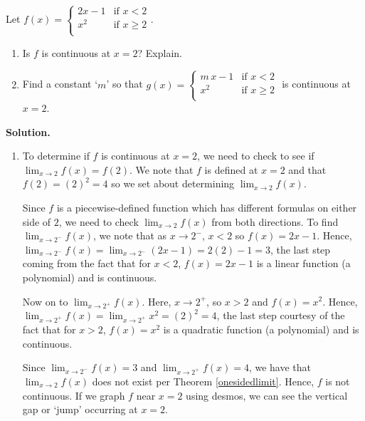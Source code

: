 \documentclass{ximera}
\begin{document}
\begin{example} \label{piecewisecontex}    Let $f(x) = \begin{cases}  2x-1 &  \text{if $x  < 2$}  \\  x^2   & \text{if $x \geq 2$} \\  \end{cases}$.

\begin{enumerate}

\item Is $f$ is continuous at $x = 2$?    Explain.

\item  Find a constant `$m$' so that $g(x) = \begin{cases}  m \, x-1 &  \text{if $x  < 2$}  \\  x^2   & \text{if $x \geq 2$} \\  \end{cases}$ is continuous at $x = 2$.

\end{enumerate}

{\bf Solution.}

\begin{enumerate}

\item To determine if $f$ is continuous at $x=2$, we need to check to see if $\lim_{x \rightarrow 2} f(x) = f(2)$.   We note that $f$ is defined at $x=2$ and that  $f(2) = (2)^2 = 4$ so we set about determining  $\lim_{x \rightarrow 2} f(x)$.  

Since $f$ is a piecewise-defined function which has different formulas on either side of $2$, we need to check $\lim_{x \rightarrow 2} f(x)$ from both directions.  To find $\lim_{x \rightarrow 2^{-}} f(x)$, we note that as $x\rightarrow 2^{-}$, $x < 2$ so $f(x) = 2x-1$.  Hence, $\lim_{x \rightarrow 2^{-}} f(x) = \lim_{x \rightarrow 2^{-}} (2x-1) = 2(2)-1 = 3$, the last step coming from the fact that for $x<2$, $f(x) = 2x-1$ is a linear function (a polynomial)  and is continuous.  

Now on to  $\lim_{x \rightarrow 2^{+}} f(x)$.  Here, $x\rightarrow 2^{+}$, so $x > 2$ and  $f(x) = x^2$.  Hence, $\lim_{x \rightarrow 2^{+}} f(x) = \lim_{x \rightarrow 2^{+}} x^2 = (2)^2 = 4$,  the last step courtesy of the fact that for $x>2$,  $f(x) = x^2$ is a quadratic function (a polynomial) and is continuous.  



Since $\lim_{x \rightarrow 2^{-}} f(x) = 3$ and $\lim_{x \rightarrow 2^{+}} f(x) = 4$, we have that $\lim_{x \rightarrow 2} f(x)$ does not exist per Theorem \ref{onesidedlimit}.  Hence, $f$ is not continuous.  If we graph $f$ near $x=2$ using desmos, we can see the vertical gap or `jump' occurring at $x = 2$.  


\end{enumerate}
\end{example}
\end{document}
